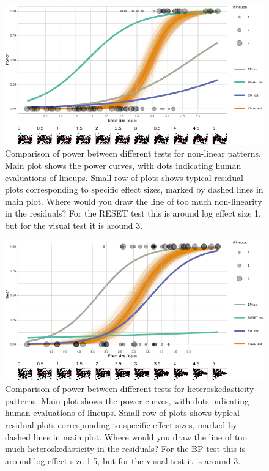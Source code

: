 \documentclass[]{interact}
\theoremstyle{plain}%
\theoremstyle{definition}
\theoremstyle{remark}
\begin{document}
\begin{figure}

{\centering \includegraphics[width=1\linewidth]{paper_comparison_files/figure-latex/polypower-1} 

}

\caption{Comparison of power between different tests for non-linear patterns. Main plot shows the power curves, with dots indicating human evaluations of lineups. Small row of plots shows typical residual plots corresponding to specific effect sizes, marked by dashed lines in main plot. Where would you draw the line of too much non-linearity in the residuals? For the RESET test this is around log effect size 1, but for the visual test it is around 3.}\label{fig:polypower}
\end{figure}

\begin{figure}

{\centering \includegraphics[width=1\linewidth]{paper_comparison_files/figure-latex/heterpower-1} 

}

\caption{Comparison of power between different tests for heteroskedasticity patterns. Main plot shows the power curves, with dots indicating human evaluations of lineups. Small row of plots shows typical residual plots corresponding to specific effect sizes, marked by dashed lines in main plot. Where would you draw the line of too much heteroskedasticity in the residuals? For the BP test this is around log effect size 1.5, but for the visual test it is around 3.}\label{fig:heterpower}
\end{figure}
\end{document}
